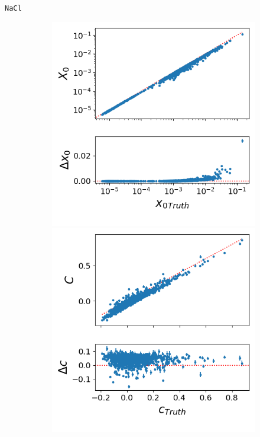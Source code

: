\documentclass{beamer}
\def\nacl{\texttt{NaCl}\xspace}
\begin{document}
\begin{frame}{\nacl}
\begin{figure}
	\begin{subfigure}{0.49\textwidth}
		\centering
		\includegraphics[height=.45\textheight]{figures/nacl_x0.png}
		\includegraphics[height=.45\textheight]{figures/nacl_c.png}

\end{subfigure}
\end{figure}
\end{frame}
\end{document}
